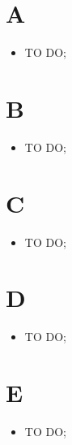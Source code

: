 %


\section*{A} %
\label{sec:a}
	\begin{itemize}
		\item TO DO;
	\end{itemize}

\section*{B} %
\label{sec:b}
	\begin{itemize}
		\item TO DO;
	\end{itemize}

\section*{C} %
\label{sec:c}
	\begin{itemize}
		\item TO DO;
	\end{itemize}

\section*{D} %
\label{sec:d}
	\begin{itemize}
		\item TO DO;
	\end{itemize}

\section*{E} %
\label{sec:e}
	\begin{itemize}
		\item TO DO;
	\end{itemize}
